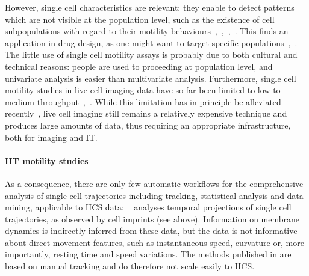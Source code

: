 However, single cell characteristics are relevant: they enable to detect patterns which are not visible at the population level, such as the existence of cell subpopulations with regard to their motility behaviours~\cite{pmid24324630},~\cite{pmid25129619},~\cite{pmid25799384},~\cite{motiw}. This finds an application in drug design, as one might want to target specific populations~\cite{pmid15539606},~\cite{pmid20461076}. The little use of single cell motility assays is probably due to both cultural and technical reasons: people are used to proceeding at population level, and univariate analysis is easier than multivariate analysis. Furthermore, single cell motility studies in live cell imaging data have so far been limited to low-to-medium throughput~\cite{pmid21423205},~\cite{pmid25799384}. While this limitation has in principle be alleviated recently~\cite{pmid20360735}, live cell imaging still remains a relatively expensive technique and produces large amounts of data, thus requiring an appropriate infrastructure, both for imaging and IT. 

\paragraph*{HT motility studies\\}
As a consequence, there are only few automatic workflows for the comprehensive analysis of single cell trajectories including tracking, statistical analysis and data mining, applicable to HCS data: ~\cite{pmid25774502} analyses temporal projections of single cell trajectories, as observed by cell imprints (see above). Information on membrane dynamics is indirectly inferred from these data, but the data is not informative about direct movement features, such as instantaneous speed, curvature or, more importantly, resting time and speed variations. The methods published in \cite{pmid24324630} are based on manual tracking and do therefore not scale easily to HCS. 


